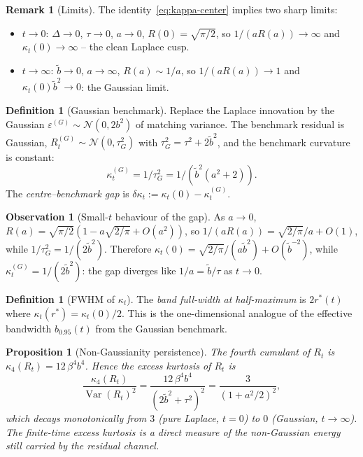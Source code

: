 \documentclass[11pt,a4paper]{article}
\theoremstyle{plainserif}
\newtheorem{proposition}[theorem]{Proposition}
\theoremstyle{definition}
\newtheorem{definition}[theorem]{Definition}
\newtheorem{observation}[theorem]{Observation}
\theoremstyle{remarkstyle}
\newtheorem*{remark}{Remark}
\newcommand{\V}{\operatorname{Var}}
\newcommand{\Normal}{\mathcal{N}}
\newcommand{\btilde}{\tilde{b}}
\newcommand{\mills}{R}
\begin{document}
\begin{remark}[Limits]
The identity~\eqref{eq:kappa-center} implies two sharp limits:
\begin{itemize}[leftmargin=2em]
\item $t\to 0$: $\Delta\to 0$, $\tau\to 0$, $a\to 0$,
$\mills(0)=\sqrt{\pi/2}$, so $1/(a\mills(a)) \to \infty$ and
$\kappa_t(0)\to\infty$ -- the clean Laplace cusp.
\item $t\to\infty$: $\btilde\to 0$, $a\to\infty$,
$\mills(a) \sim 1/a$, so $1/(a\mills(a)) \to 1$ and
$\kappa_t(0)\btilde^2 \to 0$: the Gaussian limit.
\end{itemize}
\end{remark}

\begin{definition}[Gaussian benchmark]
Replace the Laplace innovation by the Gaussian $\varepsilon^{(G)} \sim \Normal(0, 2b^2)$
of matching variance. The benchmark residual is Gaussian,
$R_t^{(G)} \sim \Normal(0,\tau_G^2)$ with $\tau_G^2 = \tau^2 + 2\btilde^2$,
and the benchmark curvature is constant:
\begin{equation}
\kappa_t^{(G)} = 1/\tau_G^2 = 1/(\btilde^2(a^2+2)).
\end{equation}
The \emph{centre--benchmark gap} is
$\delta\kappa_t := \kappa_t(0) - \kappa_t^{(G)}$.
\end{definition}

\begin{observation}[Small-$t$ behaviour of the gap]
As $a\to 0$, $\mills(a) = \sqrt{\pi/2}(1 - a\sqrt{2/\pi} + O(a^2))$, so
$1/(a\mills(a)) = \sqrt{2/\pi}/a + O(1)$, while $1/\tau_G^2 = 1/(2\btilde^2)$.
Therefore $\kappa_t(0) = \sqrt{2/\pi}/(a\btilde^2) + O(\btilde^{-2})$,
while $\kappa_t^{(G)} = 1/(2\btilde^2)$: the gap diverges like
$1/a = \btilde/\tau$ as $t\to 0$.
\end{observation}

\begin{definition}[FWHM of $\kappa_t$]
\label{def:fwhm}
The \emph{band full-width at half-maximum} is $2r^*(t)$ where
$\kappa_t(r^*) = \kappa_t(0)/2$. This is the one-dimensional analogue
of the effective bandwidth $b_{0.95}(t)$ from the Gaussian benchmark.
\end{definition}

\begin{proposition}[Non-Gaussianity persistence]
\label{prop:persistence}
The fourth cumulant of $R_t$ is
$\kappa_4(R_t) = 12\,\beta^4 b^4$. Hence the excess kurtosis of $R_t$ is
\begin{equation}
\frac{\kappa_4(R_t)}{\V(R_t)^2} = \frac{12\,\beta^4 b^4}{(2\btilde^2+\tau^2)^2}
= \frac{3}{(1 + a^2/2)^2},
\end{equation}
which decays monotonically from $3$ (pure Laplace, $t=0$) to $0$ (Gaussian,
$t\to\infty$). The finite-time excess kurtosis is a direct measure of the
non-Gaussian energy still carried by the residual channel.
\end{proposition}
\end{document}
